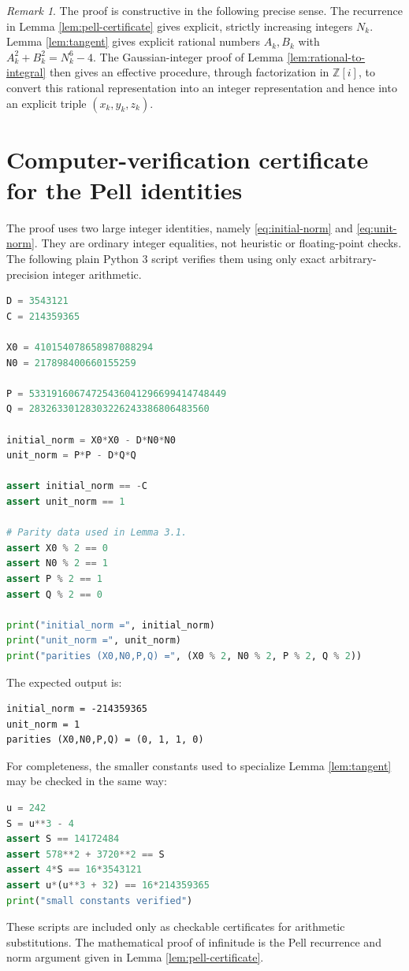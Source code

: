 \documentclass[11pt]{article}
\theoremstyle{remark}
\newtheorem{remark}[theorem]{Remark}
\begin{document}
\begin{remark}
The proof is constructive in the following precise sense.  The recurrence in
Lemma \ref{lem:pell-certificate} gives explicit, strictly increasing integers
\(N_k\).  Lemma \ref{lem:tangent} gives explicit rational numbers
\(A_k,B_k\) with \(A_k^2+B_k^2=N_k^6-4\).  The Gaussian-integer proof of Lemma
\ref{lem:rational-to-integral} then gives an effective procedure, through
factorization in \(\mathbb Z[i]\), to convert this rational representation into
an integer representation and hence into an explicit triple \((x_k,y_k,z_k)\).
\end{remark}


\appendix
\section{Computer-verification certificate for the Pell identities}

The proof uses two large integer identities, namely \eqref{eq:initial-norm} and
\eqref{eq:unit-norm}.  They are ordinary integer equalities, not heuristic or
floating-point checks.  The following plain Python 3 script verifies them using
only exact arbitrary-precision integer arithmetic.

\begin{lstlisting}[language=Python,caption={Exact verification of the two Pell norm identities.}]
D = 3543121
C = 214359365

X0 = 410154078658987088294
N0 = 217898400660155259

P = 53319160674725436041296699414748449
Q = 28326330128303226243386806483560

initial_norm = X0*X0 - D*N0*N0
unit_norm = P*P - D*Q*Q

assert initial_norm == -C
assert unit_norm == 1

# Parity data used in Lemma 3.1.
assert X0 % 2 == 0
assert N0 % 2 == 1
assert P % 2 == 1
assert Q % 2 == 0

print("initial_norm =", initial_norm)
print("unit_norm =", unit_norm)
print("parities (X0,N0,P,Q) =", (X0 % 2, N0 % 2, P % 2, Q % 2))
\end{lstlisting}

The expected output is:

\begin{lstlisting}
initial_norm = -214359365
unit_norm = 1
parities (X0,N0,P,Q) = (0, 1, 1, 0)
\end{lstlisting}

For completeness, the smaller constants used to specialize Lemma
\ref{lem:tangent} may be checked in the same way:

\begin{lstlisting}[language=Python,caption={Exact verification of the smaller constants.}]
u = 242
S = u**3 - 4
assert S == 14172484
assert 578**2 + 3720**2 == S
assert 4*S == 16*3543121
assert u*(u**3 + 32) == 16*214359365
print("small constants verified")
\end{lstlisting}

These scripts are included only as checkable certificates for arithmetic
substitutions.  The mathematical proof of infinitude is the Pell recurrence and
norm argument given in Lemma \ref{lem:pell-certificate}.
\end{document}
